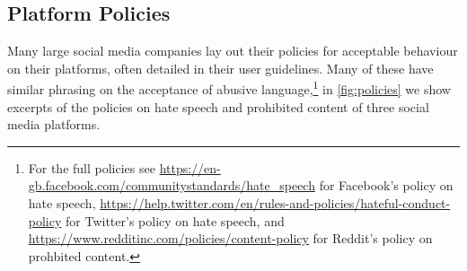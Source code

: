 \subsection{Platform Policies}

Many large social media companies lay out their policies for acceptable behaviour on their platforms, often detailed in their user guidelines. Many of these have similar phrasing on the acceptance of abusive language,\footnote{For the full policies see \url{https://en-gb.facebook.com/communitystandards/hate_speech} for Facebook's policy on hate speech, \url{https://help.twitter.com/en/rules-and-policies/hateful-conduct-policy} for Twitter's policy on hate speech, and \url{https://www.redditinc.com/policies/content-policy} for Reddit's policy on prohbited content.} in \autoref{fig:policies} we show excerpts of the policies on hate speech and prohibited content of three social media platforms.

